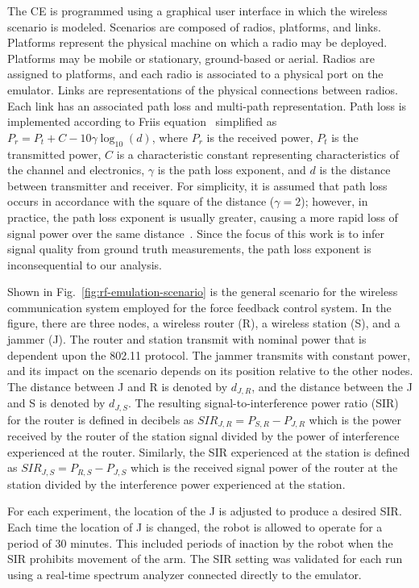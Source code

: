 The CE is programmed using a graphical user interface in which the wireless scenario is modeled.  Scenarios are composed of radios, platforms, and links.  Platforms represent the physical machine on which a radio may be deployed.  Platforms may be mobile or stationary, ground-based or aerial. Radios are assigned to platforms, and each radio is associated to a physical port on the emulator.  Links are representations of the physical connections between radios.  Each link has an associated path loss and multi-path representation.  Path loss is implemented according to Friis equation~\cite{Shaw2013.Frii} simplified as 
$P_r = P_t + C - 10\gamma\log_{10}\left( d \right)$, 
where $P_r$ is the received power, $P_t$ is the transmitted power, $C$ is a characteristic constant representing characteristics of the channel and electronics, $\gamma$ is the path loss exponent, and $d$ is the distance between transmitter and receiver.  For simplicity, it is assumed that path loss occurs in accordance with the square of the distance ($\gamma=2$); however, in practice, the path loss exponent is usually greater, causing a more rapid loss of signal power over the same distance~\cite{Candell2017.NIST1951}.  Since the focus of this work is to infer signal quality from ground truth measurements, the path loss exponent is inconsequential to our analysis.


Shown in Fig.~\ref{fig:rf-emulation-scenario} is the general scenario for the wireless communication system employed for the force feedback control system.  In the figure, there are three nodes, a wireless router (R), a wireless station (S), and a jammer (J).  The router and station transmit with nominal power that is dependent upon the 802.11 protocol. The jammer transmits with constant power, and its impact on the scenario depends on its position relative to the other nodes.  The distance between J and R is denoted by $d_{J,R}$, and the distance between the J and S is denoted by $d_{J,S}$.  The resulting signal-to-interference power ratio (SIR) for the router is defined in decibels as $SIR_{J,R} = P_{S,R}-P_{J,R}$ which is the power received by the router of the station signal divided by the power of interference experienced at the router.  Similarly, the SIR experienced at the station is defined as $SIR_{J,S} = P_{R,S}-P_{J,S}$ which is the received signal power of the router at the station divided by the interference power experienced at the station.

For each experiment, the location of the J is adjusted to produce a desired SIR.  Each time the location of J is changed, the robot is allowed to operate for a period of 30 minutes.  This included periods of inaction by the robot when the SIR prohibits movement of the arm.  The SIR setting was validated for each run using a real-time spectrum analyzer connected directly to the emulator.

	
	
	
	
	


